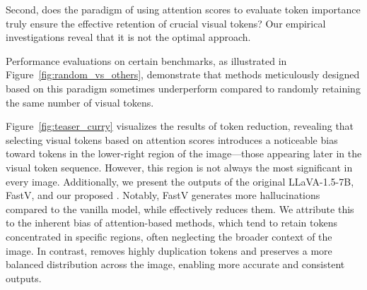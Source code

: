 Second, does the paradigm of using attention scores to evaluate token importance truly ensure the effective retention of crucial visual tokens? Our empirical investigations reveal that it is not the optimal approach.

Performance evaluations on certain benchmarks, as illustrated in Figure~\ref{fig:random_vs_others}, demonstrate that methods meticulously designed based on this paradigm sometimes underperform compared to randomly retaining the same number of visual tokens.

Figure~\ref{fig:teaser_curry} visualizes the results of token reduction, revealing that selecting visual tokens based on attention scores introduces a noticeable bias toward tokens in the lower-right region of the image—those appearing later in the visual token sequence. However, this region is not always the most significant in every image. Additionally, we present the outputs of the original LLaVA-1.5-7B, FastV, and our proposed \algname. Notably, FastV generates more hallucinations compared to the vanilla model, while \algname effectively reduces them. 
We attribute this to the inherent bias of attention-based methods, which tend to retain tokens concentrated in specific regions, often neglecting the broader context of the image. In contrast, \algname removes highly duplication tokens and preserves a more balanced distribution across the image, enabling more accurate and consistent outputs.

